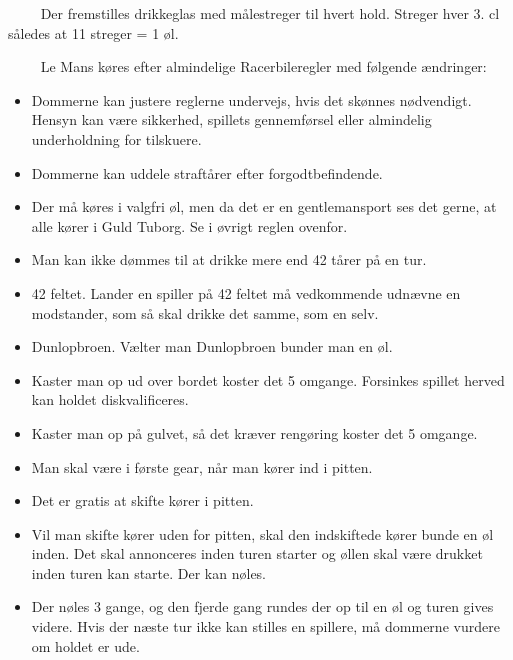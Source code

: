 \documentclass[12pt]{article}
\begin{document}
$\qquad$ Der fremstilles drikkeglas med målestreger til hvert hold. Streger hver 3. cl således at 11 streger = 1 øl.

$\qquad$ Le Mans køres efter almindelige Racerbileregler med følgende ændringer:

\begin{itemize}

	\item Dommerne kan justere reglerne undervejs, hvis det skønnes nødvendigt. Hensyn kan være sikkerhed, spillets gennemførsel eller almindelig underholdning for tilskuere.

	\item Dommerne kan uddele straftårer efter forgodtbefindende.

	\item Der må køres i valgfri øl, men da det er en gentlemansport ses det gerne, at alle kører i Guld Tuborg. Se i øvrigt reglen ovenfor.

	\item Man kan ikke dømmes til at drikke mere end 42 tårer på en tur.

	\item 42 feltet. Lander en spiller på 42 feltet må vedkommende udnævne en modstander, som så skal drikke det samme, som en selv.

	\item Dunlopbroen. Vælter man Dunlopbroen bunder man en øl.

	\item Kaster man op ud over bordet koster det 5 omgange. Forsinkes spillet herved kan holdet diskvalificeres.

	\item Kaster man op på gulvet, så det kræver rengøring koster det 5 omgange.

	\item Man skal være i første gear, når man kører ind i pitten.

	\item Det er gratis at skifte kører i pitten.

	\item Vil man skifte kører uden for pitten, skal den indskiftede kører bunde en øl inden. Det skal annonceres inden turen starter og øllen skal være drukket inden turen kan starte. Der kan nøles.

	\item Der nøles 3 gange, og den fjerde gang rundes der op til en øl og turen gives videre. Hvis der næste tur ikke kan stilles en spillere, må dommerne vurdere om holdet er ude.


\end{itemize}
\end{document}
